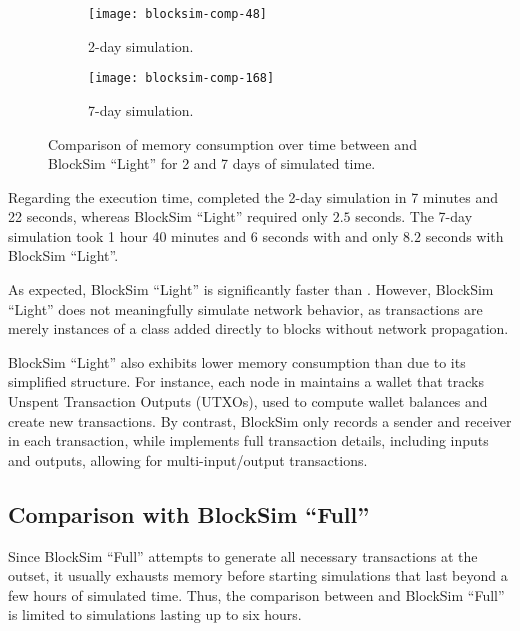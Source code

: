 \begin{figure}[p]
	\centering
	\begin{subfigure}[b]{0.85\textwidth}
		\centering
		\texttt{[image: blocksim-comp-48]}
		\caption{2-day simulation.}\label{subfig:comparison-48h}
	\end{subfigure}
	\par\bigskip\medskip
	\begin{subfigure}[b]{0.85\textwidth}
		\centering
		\texttt{[image: blocksim-comp-168]}
		\caption{7-day simulation.}\label{subfig:comparison-168h}
	\end{subfigure}
	\caption{Comparison of memory consumption over time between \iblock{}
	and BlockSim ``Light'' for 2 and 7 days of simulated
	time.}\label{fig:comparison-light}
\end{figure}

Regarding the execution time, \iblock{} completed the 2-day simulation in 7
minutes and 22 seconds, whereas BlockSim ``Light'' required only \(2.5\)
seconds. The 7-day simulation took 1 hour 40 minutes and 6 seconds with
\iblock{} and only \(8.2\) seconds with BlockSim ``Light''.

As expected, BlockSim ``Light'' is significantly faster than \iblock{}.
However, BlockSim ``Light'' does not meaningfully simulate network behavior, as
transactions are merely instances of a class added directly to blocks without
network propagation.

BlockSim ``Light'' also exhibits lower memory consumption than \iblock{} due to
its simplified structure. For instance, each node in \iblock{} maintains a
wallet that tracks Unspent Transaction Outputs (UTXOs), used to compute wallet
balances and create new transactions. By contrast, BlockSim only records a
sender and receiver in each transaction, while \iblock{} implements full
transaction details, including inputs and outputs, allowing for
multi-input/output transactions.

\subsection{Comparison with BlockSim ``Full''}

Since BlockSim ``Full'' attempts to generate all necessary transactions at the
outset, it usually exhausts memory before starting simulations that last beyond
a few hours of simulated time. Thus, the comparison between \iblock{} and
BlockSim ``Full'' is limited to simulations lasting up to six hours.

